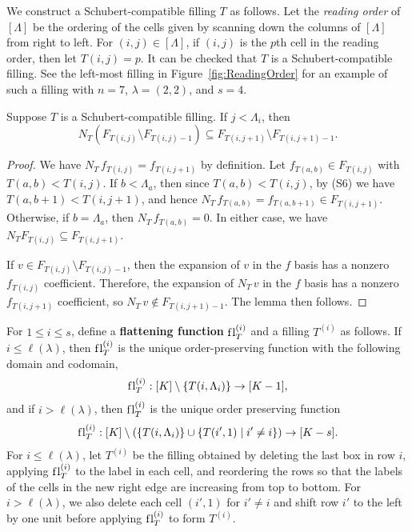 \documentclass[12pt]{amsart}
\newcommand{\fl}{\mathrm{f\hspace{0.25pt}l}}
\newcommand{\ufl}{\mathrm{ufl}}
\begin{document}
\begin{example}\label{ex:ReadingOrder}
We construct a Schubert-compatible filling $T$ as follows. 
Let the \emph{reading order} of $[\Lambda]$ be the ordering of the cells given by scanning down the columns of $[\Lambda]$ from right to left. For $(i,j)\in [\Lambda]$, if $(i,j)$ is the $p$th cell in the reading order, then let $T(i,j)=p$. It can be checked that $T$ is a Schubert-compatible filling. See the left-most filling in Figure~\ref{fig:ReadingOrder} for an example of such a filling with $n=7$, $\lambda = (2,2)$, and $s=4$.
\end{example}

\begin{lemma}\label{lem:S6}
Suppose $T$ is a Schubert-compatible filling. If $j<\Lambda_i$, then \[N_T (F_{T(i,j)}\setminus F_{T(i,j)-1}) \subseteq F_{T(i,j+1)}\setminus F_{T(i,j+1)-1}.\]
\end{lemma}

\begin{proof}
We have $N_T \, f_{T(i,j)} = f_{T(i,j+1)}$ by definition. Let $f_{T(a,b)}\in F_{T(i,j)}$ with $T(a,b) < T(i,j)$. If $b<\Lambda_a$, then since $T(a,b) < T(i,j)$, by (S6) we have $T(a,b+1) < T(i,j+1)$, and hence $N_T\, f_{T(a,b)} = f_{T(a,b+1)}\in F_{T(i,j+1)}$. Otherwise, if $b=\Lambda_a$, then $N_T\, f_{T(a,b)} = 0$. In either case, we have $N_T F_{T(i,j)} \subseteq F_{T(i,j+1)}$. 

If $v\in F_{T(i,j)}\setminus F_{T(i,j)-1}$, then the expansion of $v$ in the $f$ basis has a nonzero $f_{T(i,j)}$ coefficient. Therefore, the expansion of $N_T\, v$ in the $f$ basis has a nonzero $f_{T(i,j+1)}$ coefficient, so $N_T\, v\notin F_{T(i,j+1)-1}$. The lemma then follows.
\end{proof}



For $1\leq i \leq s$, define a {\bf flattening function} $\fl_T^{(i)}$ 
and a filling $T^{(i)}$ as follows.
If $i\leq \ell(\lambda)$, then $\fl_T^{(i)}$ is the unique order-preserving function with the following domain and codomain,
\begin{align}
    \fl_T^{(i)} : [K]\setminus\{ T(i,\Lambda_i) \} \to [K-1],
\end{align}
and if $i> \ell(\lambda)$, then $\fl_T^{(i)}$ is the unique order preserving function
\begin{align}
    \fl_T^{(i)}: [K]\setminus(\{T(i,\Lambda_i)\}\cup \{T(i',1)\mid i'\neq i\}) \to [K-s].
\end{align}
For $i\leq \ell(\lambda)$, let $T^{(i)}$ be the filling obtained by deleting the last box in row $i$, applying $\fl_T^{(i)}$ to the label in each cell, and reordering the rows so that the labels of the cells in the new right edge are increasing from top to bottom.
For $i>\ell(\lambda)$, we also delete each cell $(i',1)$ for $i'\neq i$ and shift row $i'$ to the left by one unit before applying $\fl_T^{(i)}$ to form $T^{(i)}$.
\end{document}
